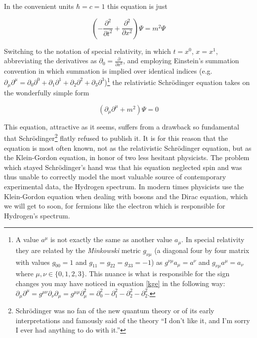 \documentclass[a4paper,12pt]{book}
\begin{document}
In the convenient units $\hbar=c=1$ this equation is just

\begin{equation}
\left(-\frac{\partial^{2}}{\partial t^{2}}+\frac{\partial^{2}}{\partial x^{2}}\right)\Psi=m^{2}\Psi 
\end{equation}

Switching to the notation of special relativity, in which $t=x^{0}$, $x=x^{1}$, abbreviating the derivatives as $\partial_{0}=\frac{\partial}{\partial x^{0}}$, and employing Einstein's summation convention in which summation is implied over identical indices (e.g. $\partial_{\mu}\partial^{\mu}=\partial_{0}\partial^{0}+\partial_{1}\partial^{1}+\partial_{2}\partial^{2}+\partial_{3}\partial^{3}$)\footnote{A value $a^{\mu}$ is not exactly the same as another value $a_{\mu}$. In special relativity they are related by the \textit{Minkowski} metric $g_{\nu \mu}$ (a diagonal four by four matrix with values $g_{00}=1$ and $g_{11}=g_{22}=g_{33}=-1$) as $g^{\nu \mu}a_{\mu}=a^{\nu}$ and $g_{\nu \mu}a^{\mu}=a_{\nu}$ where $\mu, \nu \in \{0,1,2,3\}$. This nuance is what is responsible for the sign changes you may have noticed in equation \ref{kge} in the following way: $\partial_{\mu}\partial^{\mu}=g^{\mu \nu}\partial_{\nu}\partial_{\mu}=g^{\mu \mu}\partial_{\mu}^{2}=\partial_{0}^{2}-\partial_{1}^{2}-\partial_{2}^{2}-\partial_{2}^{2}$.} the relativistic Schr\"{o}dinger equation takes on the wonderfully simple form

\begin{equation}\label{kge}
 (\partial_{\mu}\partial^{\mu}+m^{2})\Psi=0
\end{equation}

This equation, attractive as it seems, suffers from a drawback so fundamental that Schr\"{o}dinger\footnote{Schr\"{o}dinger was no fan of the new quantum theory or of its early interpretations and famously said of the theory ``I don't like it, and I'm sorry I ever had anything to do with it.''} flatly refused to publish it. It is for this reason that the equation is most often known, not as the relativistic Schr\"{o}dinger equation, but as the Klein-Gordon equation, in honor of two less hesitant physicists. The problem which stayed Schr\"{o}dinger's hand was that his equation neglected spin and was thus unable to correctly model the most valuable source of contemporary experimental data, the Hydrogen spectrum. In modern times physicists use the Klein-Gordon equation when dealing with bosons and the Dirac equation, which we will get to soon, for fermions like the electron which is responsible for Hydrogen's spectrum.
\end{document}
